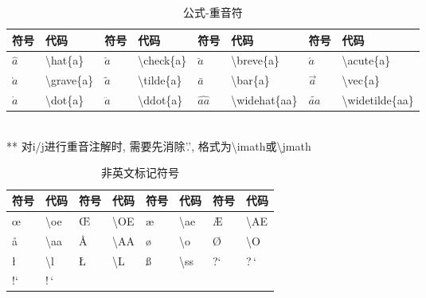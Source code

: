 \documentclass[UTF8,fontset=ubuntu]{ctexbook}
\begin{document}
\begin{table}[H]
\begin{tabular}{l l l l l l l l}
	\hline
	符号 & 代码 & 符号 & 代码 & 符号 & 代码 & 符号 & 代码\\
	\hline
	$\hat{a}$ & \textbackslash hat\{a\} & $\check{a}$ & \textbackslash check\{a\} & $\breve{a}$ & \textbackslash breve\{a\} & $\acute{a}$ & \textbackslash acute\{a\}\\
	$\grave{a}$ & \textbackslash grave\{a\} & $\tilde{a}$ & \textbackslash tilde\{a\} & $\bar{a}$ & \textbackslash bar\{a\} & $\vec{a}$ & \textbackslash vec\{a\}\\
	$\dot{a}$ & \textbackslash dot\{a\} & $\ddot{a}$ & \textbackslash ddot\{a\} & $\widehat{aa}$ & \textbackslash widehat\{aa\} & $\widetilde{aa}$ & \textbackslash widetilde\{aa\}\\
	\hline
\end{tabular}\\[2mm]
** 对i/j进行重音注解时, 需要先消除'.', 格式为\textbackslash imath或\textbackslash jmath
\caption{公式-重音符}
\end{table}

\begin{table}[H]
\begin{tabular}{l l l l l l l l}
	\hline
	符号 & 代码 & 符号 & 代码 & 符号 & 代码 & 符号 & 代码\\
	\hline
	\oe & \textbackslash oe & \OE & \textbackslash OE & \ae & \textbackslash ae & \AE & \textbackslash AE\\
	\aa & \textbackslash aa & \AA & \textbackslash AA & \o & \textbackslash o & \O & \textbackslash O\\
	\l & \textbackslash l & \L & \textbackslash L & \ss & \textbackslash ss & ?` & ?\,`\\
	!` & !\,`\\
	\hline
\end{tabular}
\caption{非英文标记符号}
\end{table}
\end{document}
